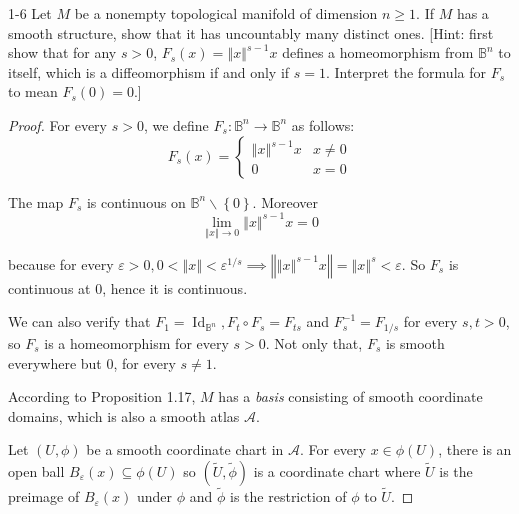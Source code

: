 \begin{problem}{1-6}
    Let \( M \) be a nonempty topological manifold of dimension \( n \ge 1 \). If \( M \) has a smooth structure, show that it has uncountably many distinct ones. [Hint: first show that for any \( s > 0 \), \( F_{s}(x) = {\left\Vert x \right\Vert}^{s-1} x \) defines a homeomorphism from \( \mathbb{B}^{n} \) to itself, which is a diffeomorphism if and only if \( s = 1 \). Interpret the formula for \( F_{s} \) to mean \( F_{s}(0) = 0 \).]
\end{problem}

\begin{proof}
    For every \( s > 0 \), we define \( F_{s}: \mathbb{B}^{n} \to \mathbb{B}^{n} \) as follows:
    \[
        F_{s}(x) = \begin{cases}
            {\left\Vert x \right\Vert}^{s-1} x & x \ne 0 \\
            0                                  & x = 0
        \end{cases}
    \]

    The map \( F_{s} \) is continuous on \( \mathbb{B}^{n} \smallsetminus \left\{0\right\} \). Moreover
    \[
        \lim\limits_{\left\Vert x \right\Vert \to 0} {\left\Vert x \right\Vert}^{s-1} x = 0
    \]

    because for every \( \varepsilon > 0, 0 < \left\Vert x \right\Vert < \varepsilon^{1/s} \implies \left\Vert {\left\Vert x \right\Vert}^{s-1} x \right\Vert = {\left\Vert x \right\Vert}^{s} < \varepsilon \). So \( F_{s} \) is continuous at \( 0 \), hence it is continuous.

    We can also verify that \( F_{1} = \operatorname{Id}_{\mathbb{B}^{n}}, F_{t} \circ F_{s} = F_{ts} \) and \( F_{s}^{-1} = F_{1/s} \) for every \( s, t > 0 \), so \( F_{s} \) is a homeomorphism for every \( s > 0 \). Not only that, \( F_{s} \) is smooth everywhere but \( 0 \), for every \( s \ne 1 \).

    According to Proposition 1.17, \( M \) has a \emph{basis} consisting of smooth coordinate domains, which is also a smooth atlas \( \mathcal{A} \).

    Let \( (U, \phi) \) be a smooth coordinate chart in \( \mathcal{A} \). For every \( x \in \phi(U) \), there is an open ball \( B_{\varepsilon}(x) \subseteq \phi(U) \) so \( (\widetilde{U}, \widetilde{\phi}) \) is a coordinate chart where \( \widetilde{U} \) is the preimage of \( B_{\varepsilon}(x) \) under \( \phi \) and \( \widetilde{\phi} \) is the restriction of \( \phi \) to \( \widetilde{U} \).


\end{proof}
